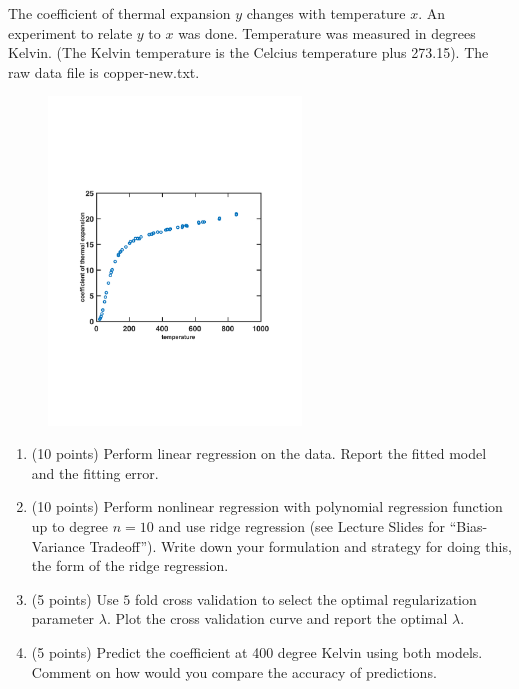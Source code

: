 \documentclass[twoside,10pt]{article}
\begin{document}
The coefficient of thermal expansion $y$ changes with temperature $x$. An experiment to relate $y$ to $x$ was done. Temperature was measured in degrees Kelvin. (The Kelvin temperature is the Celcius temperature plus 273.15). The raw data file is \textsf{copper-new.txt}.

\begin{figure}[h!]
\begin{center}
\includegraphics[width = 0.6\textwidth]{t_c}
\end{center}
\end{figure}

\begin{enumerate}

\item (10 points) Perform linear regression on the data. Report the fitted model and the fitting error.
\item (10 points) Perform nonlinear regression with polynomial regression function up to degree $n = 10$ and use ridge regression (see Lecture Slides for ``Bias-Variance Tradeoff''). Write down your formulation and strategy for doing this, the form of the ridge regression. 
\item (5 points) Use $5$ fold cross validation to select the optimal regularization parameter $\lambda$. Plot the cross validation curve and report the optimal $\lambda$.
\item (5 points) Predict the coefficient at 400 degree Kelvin using both models. Comment on how would you compare the accuracy of predictions. 
\end{enumerate}
\end{document}
